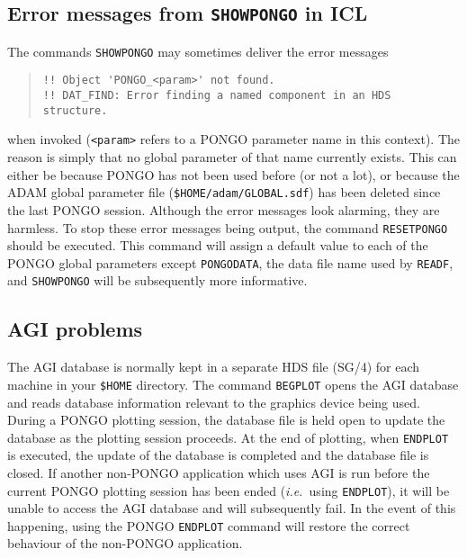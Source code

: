 \documentclass[twoside,11pt]{article}
\newcommand{\htmlref}[2]{#1}
\newcommand{\xref}[3]{#1}
\renewcommand{\_}{\texttt{\symbol{95}}}
\newcommand{\ie}{{\em i.e.\ }}
\newcommand{\pnam}[1]{{\tt #1}}
\newcommand{\cnam}[1]{{\tt #1}}
\newcommand{\iref} [1]{\htmlref{#1}{#1}}
\begin{document}
\subsection{Error messages from \cnam{SHOWPONGO} in ICL}

The commands \cnam{\iref{SHOWPONGO}} may sometimes deliver the error messages
\begin{quote}
\begin{verbatim}
!! Object 'PONGO_<param>' not found.
!! DAT_FIND: Error finding a named component in an HDS structure.
\end{verbatim}
\end{quote}
when invoked (\verb+<param>+ refers to a PONGO parameter name in this
context).
The reason is simply that no global parameter of that name currently exists.
This can either be because PONGO has not been used before (or not a lot),
or because the ADAM global parameter file (\verb+$HOME/adam/GLOBAL.sdf+) has
been deleted since the last PONGO session.
Although the error messages look alarming, they are harmless.
To stop these error messages being output, the command \cnam{\iref{RESETPONGO}}
should be executed.
This command will assign a default value to each of the PONGO global parameters
except \pnam{PONGO\_DATA}, the data file name used by \cnam{\iref{READF}}, and
\cnam{\iref{SHOWPONGO}} will be subsequently more informative.


\subsection{AGI problems}

The \xref{AGI}{sun48}{} database is normally kept in a separate
\xref{HDS file}{sun95}{} \xref{(SG/4)}{sg4}{} for each machine in your
\verb+$HOME+ directory.  The command \cnam{\iref{BEGPLOT}} opens the
AGI database and reads database information relevant to the graphics
device being used.  During a PONGO plotting session, the database file
is held open to update the database as the plotting session proceeds.
At the end of plotting, when \cnam{\iref{ENDPLOT}} is executed, the
update of the database is completed and the database file is closed.
If another non-PONGO application which uses AGI is run before the
current PONGO plotting session has been ended (\ie using
\cnam{\iref{ENDPLOT}}), it will be unable to access the AGI database and will
subsequently fail.  In the event of this happening, using the PONGO
\cnam{\iref{ENDPLOT}} command will restore the correct behaviour of the
non-PONGO application.
\end{document}
